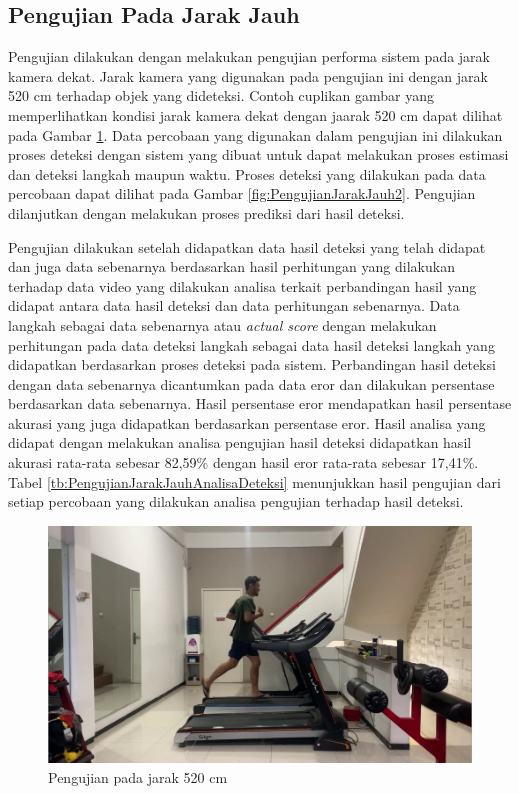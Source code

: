 \subsection{Pengujian Pada Jarak Jauh}
\label{subsec:PengujianJarakJauh}

Pengujian dilakukan dengan melakukan pengujian performa sistem pada jarak kamera dekat. Jarak kamera yang digunakan pada pengujian ini dengan jarak 520 cm terhadap objek yang dideteksi. Contoh cuplikan gambar yang memperlihatkan kondisi jarak kamera dekat dengan jaarak 520 cm dapat dilihat pada Gambar \ref{fig:PengujianJarakJauh}. Data percobaan yang digunakan dalam pengujian ini dilakukan proses deteksi dengan sistem yang dibuat untuk dapat melakukan proses estimasi dan deteksi langkah maupun waktu. Proses deteksi yang dilakukan pada data percobaan dapat dilihat pada Gambar \ref{fig:PengujianJarakJauh2}. Pengujian dilanjutkan dengan melakukan proses prediksi dari hasil deteksi.

Pengujian dilakukan setelah didapatkan data hasil deteksi yang telah didapat dan juga data sebenarnya berdasarkan hasil perhitungan yang dilakukan terhadap data video yang dilakukan analisa terkait perbandingan hasil yang didapat antara data hasil deteksi dan data perhitungan sebenarnya. Data langkah sebagai data sebenarnya atau \emph{actual score} dengan melakukan perhitungan pada data deteksi langkah sebagai data hasil deteksi langkah yang didapatkan berdasarkan proses deteksi pada sistem. Perbandingan hasil deteksi dengan data sebenarnya dicantumkan pada data eror dan dilakukan persentase berdasarkan data sebenarnya. Hasil persentase eror mendapatkan hasil persentase akurasi yang juga didapatkan berdasarkan persentase eror. Hasil analisa yang didapat dengan melakukan analisa pengujian hasil deteksi didapatkan hasil akurasi rata-rata sebesar 82,59\% dengan hasil eror rata-rata sebesar 17,41\%. Tabel \ref{tb:PengujianJarakJauhAnalisaDeteksi} menunjukkan hasil pengujian dari setiap percobaan yang dilakukan analisa pengujian terhadap hasil deteksi.

\begin{figure}[H]
  \centering
  \includegraphics[scale=0.46]{gambar/jarak_jauh.png}
  \caption{Pengujian pada jarak 520 cm}
  \label{fig:PengujianJarakJauh}
\end{figure}

